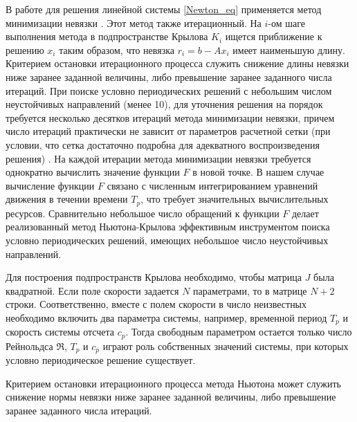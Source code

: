 В работе для решения линейной системы \eqref{Newton_eq} применяется метод минимизации невязки \cite{EEbook}. Этот метод также итерационный. На $i$-ом шаге выполнения метода в подпространстве Крылова $K_i$ ищется приближение к решению $x_i$ таким образом, что невязка $r_i = b - Ax_i$ имеет наименьшую длину. Критерием остановки итерационного процесса служить снижение длины невязки ниже заранее заданной величины, либо превышение заранее заданного числа итераций. При поиске условно периодических решений с небольшим числом неустойчивых направлений (менее 10), для уточнения решения на порядок требуется несколько десятков итераций метода минимизации невязки, причем число итераций  практически не зависит от параметров расчетной сетки (при условии, что сетка достаточно подробна для адекватного воспроизведения решения) \cite{Dijkstra2014}. На каждой итерации метода минимизации невязки требуется однократно вычислить значение функции $F$ в новой точке. В нашем случае вычисление функции $F$ связано с численным интегрированием уравнений движения в течении времени $T_p$, что требует значительных вычислительных ресурсов. Сравнительно небольшое число обращений к функции $F$ делает реализованный метод Ньютона-Крылова эффективным инструментом поиска условно периодических решений, имеющих небольшое число неустойчивых направлений.

Для построения подпространств Крылова необходимо, чтобы матрица $J$ была квадратной. Если поле скорости задается $N$ параметрами, то в матрице $N+2$ строки. Соответственно, вместе с полем скорости в число неизвестных необходимо включить два параметра системы, например, временной период $T_p$ и скорость системы отсчета $c_p$. Тогда свободным параметром остается только число Рейнольдса $\Re$, $T_p$ и $c_p$ играют роль собственных значений системы, при которых условно периодическое решение существует. 

Критерием остановки итерационного процесса метода Ньютона может служить снижение нормы невязки ниже заранее заданной величины, либо превышение заранее заданного числа итераций. 


